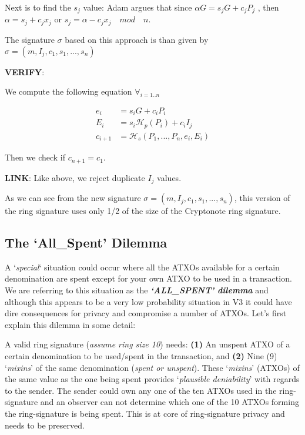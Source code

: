 \hfill \break Next is to find the $s_j$ value: Adam argues that since $\alpha G = s_jG+c_jP_j$ , then $\alpha = s_j+c_jx_j$ or $s_j = \alpha - c_jx_j\quad mod\quad n.$

\hfill \break The signature $\sigma$ based on this approach is than given by $\sigma = (m,I_j,c_1,s_1,...,s_n)$

\hfill \break\textbf{VERIFY}: 

We compute the following equation $\forall_{i=1..n}$

\begin{equation}
\begin{split}
 e_i &= s_iG+c_iP_i \\
 E_i &= s_i\mathcal{H}_p(P_i)+c_iI_j \\
 c_{i+1} &=\mathcal{H}_s(P_1,...,P_n,e_i,E_i)
\end{split}
\end{equation}

Then we check if $c_{n+1}=c_1$.

\hfill \break\textbf{LINK}: 
Like above, we reject duplicate $I_j$ values.


\hfill \break As we can see from the new signature $\sigma = (m,I_j,c_1,s_1,...,s_n)$, this version of the ring signature uses only 1/2 of the size of the Cryptonote ring signature.

\subsection{The ‘All\_Spent’ Dilemma}
A ‘\textit{special}‘ situation could occur where all the ATXOs available for a
certain denomination are spent except for your own ATXO to be used in a transaction.
We are referring to this situation as the \textbf{\textit{‘ALL\_SPENT’ dilemma}}
and although this appears to be a very low probability situation in V3 it could
have dire consequences for privacy and compromise a number of ATXOs. Let’s first
explain this dilemma in some detail:



A valid ring signature (\textit{assume ring size 10}) needs: \textbf{(1)} An
unspent ATXO of a certain denomination to be used/spent in the transaction,
and \textbf{(2)} Nine (9) ‘\textit{mixins}’ of the same denomination
(\textit{spent or unspent}). These ‘\textit{mixins}’ (ATXOs) of the same
value as the one being spent provides ‘\textit{plausible deniability}’ with
regards to the sender. The sender could own any one of the ten ATXOs used
in the ring-signature and an observer can not determine which one of the
10 ATXOs forming the ring-signature is being spent. This is at core of
ring-signature privacy and needs to be preserved.



